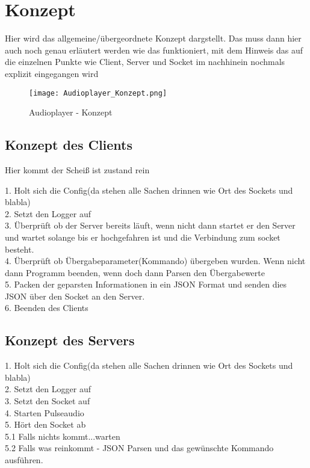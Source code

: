\section{Konzept}
Hier wird das allgemeine/übergeordnete Konzept dargstellt. Das muss dann hier auch noch genau erläutert werden wie das funktioniert, mit dem Hinweis das auf die einzelnen Punkte wie Client, Server und Socket im nachhinein nochmals explizit eingegangen wird
\begin{figure}[h]
	\centering
	\texttt{[image: Audioplayer\_Konzept.png]}
	\caption{Audioplayer - Konzept}
	\label{img:grafik-RaspberryPi3}
\end{figure}
\newline

\subsection{Konzept des Clients}
Hier kommt der Scheiß ist zustand rein

1. Holt sich die Config(da stehen alle Sachen drinnen wie Ort des Sockets und blabla)\\
2. Setzt den Logger auf \\
3. Überprüft ob der Server bereits läuft, wenn nicht dann startet er den Server und wartet solange bis er hochgefahren ist und die Verbindung zum socket besteht. \\
4. Überprüft ob Übergabeparameter(Kommando) übergeben wurden. Wenn nicht dann Programm beenden, wenn doch dann Parsen den Übergabewerte \\
5. Packen der geparsten Informationen in ein JSON Format und senden dies JSON über den Socket an den Server. \\
6. Beenden des Clients \\

\subsection{Konzept des Servers}

1. Holt sich die Config(da stehen alle Sachen drinnen wie Ort des Sockets und blabla)\\
2. Setzt den Logger auf \\
3. Setzt den Socket auf \\
4. Starten Pulseaudio \\
5. Hört den Socket ab \\
	5.1 Falls nichts kommt...warten \\
	5.2 Falls was reinkommt - JSON Parsen und das gewünschte Kommando ausführen.\\
	

